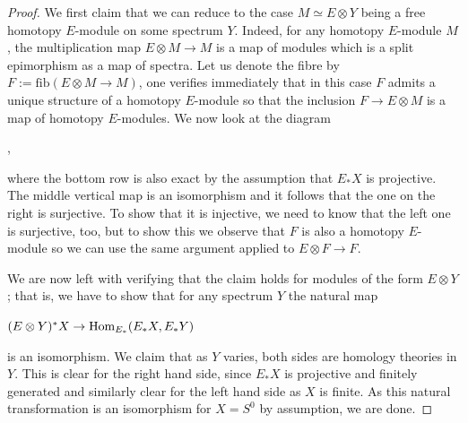 \documentclass[oneside,a4paper]{amsart}
\newcommand{\Hom}{\textnormal{Hom}} %
\theoremstyle{plain}
\theoremstyle{definition}
\theoremstyle{remark}
\begin{document}
\begin{proof}
We first claim that we can reduce to the case $M \simeq E \otimes Y$ being a free homotopy $E$-module on some spectrum $Y$. Indeed, for any homotopy $E$-module $M$, the multiplication map $E \otimes M \rightarrow M$ is a map of modules which is a split epimorphism as a map of spectra. Let us denote the fibre by $F := \mathrm{fib}(E \otimes M \rightarrow M)$, one verifies immediately that in this case $F$ admits a unique structure of a homotopy $E$-module so that the inclusion $F \rightarrow E \otimes M$ is a map of homotopy $E$-modules. We now look at the diagram 

\begin{center}
	,
\end{center} 
where the bottom row is also exact by the assumption that $E_{*}X$ is projective. The middle vertical map is an isomorphism and it follows that the one on the right is surjective. To show that it is injective, we need to know that the left one is surjective, too, but to show this we observe that $F$ is also a homotopy $E$-module so we can use the same argument applied to $E \otimes F \rightarrow F$. 

We are now left with verifying that the claim holds for modules of the form $E \otimes Y$; that is, we have to show that for any spectrum $Y$ the natural map

\begin{center}
$(E \otimes Y)^{*}X \rightarrow \Hom_{E_{*}}(E_{*}X, E_{*}Y)$ 
\end{center}
is an isomorphism. We claim that as $Y$ varies, both sides are homology theories in $Y$. This is clear for the right hand side, since $E_{*}X$ is projective and finitely generated and similarly clear for the left hand side as $X$ is finite. As this natural transformation is an isomorphism for $X = S^{0}$ by assumption, we are done.
\end{proof}
\end{document}
